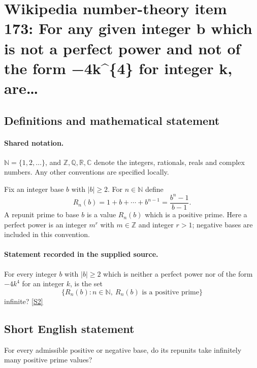 \documentclass[11pt]{article}
\newcommand{\sref}[2]{\hyperlink{source:#1:#2}{[S#2]}}
\begin{document}
\section{Wikipedia number-theory item 173: For any given integer b which is not a perfect power and not of the form −4k\textasciicircum{}\{4\} for integer k, are…}\label{statement}

\subsection{Definitions and mathematical statement}

\paragraph{Shared notation.}$\mathbb N=\{1,2,\ldots\}$, and $\mathbb Z,\mathbb Q,\mathbb R,\mathbb C$ denote the integers, rationals, reals and complex numbers. Any other conventions are specified locally.


Fix an integer base $b$ with $|b|\ge2$. For $n\in\mathbb N$ define
\[R_n(b)=1+b+\cdots+b^{n-1}=\frac{b^n-1}{b-1}.\]
A repunit prime to base $b$ is a value $R_n(b)$ which is a positive prime. Here a perfect power is an integer $m^r$ with $m\in\mathbb Z$ and integer $r>1$; negative bases are included in this convention.
\paragraph{Statement recorded in the supplied source.}
For every integer $b$ with $|b|\ge2$ which is neither a perfect power nor of the form $-4k^4$ for an integer $k$, is the set
\[\{R_n(b):n\in\mathbb N,\ R_n(b)\text{ is a positive prime}\}\]
infinite? \sref{statement}{2}
\subsection{Short English statement}
For every admissible positive or negative base, do its repunits take infinitely many positive prime values?
\end{document}
